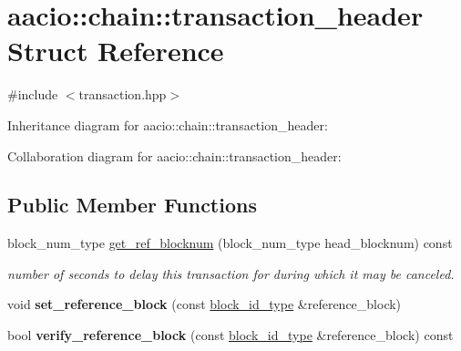 \hypertarget{structaacio_1_1chain_1_1transaction__header}{}\section{aacio\+:\+:chain\+:\+:transaction\+\_\+header Struct Reference}
\label{structaacio_1_1chain_1_1transaction__header}


{\ttfamily \#include $<$transaction.\+hpp$>$}



Inheritance diagram for aacio\+:\+:chain\+:\+:transaction\+\_\+header\+:


Collaboration diagram for aacio\+:\+:chain\+:\+:transaction\+\_\+header\+:
\subsection*{Public Member Functions}
\begin{DoxyCompactItemize}
\item 
block\+\_\+num\+\_\+type \mbox{\hyperlink{structaacio_1_1chain_1_1transaction__header_a75c22201048da255df9412817957df5f}{get\+\_\+ref\+\_\+blocknum}} (block\+\_\+num\+\_\+type head\+\_\+blocknum) const
\begin{DoxyCompactList}\small\item\em number of seconds to delay this transaction for during which it may be canceled. \end{DoxyCompactList}\item 
\mbox{\label{structaacio_1_1chain_1_1transaction__header_a7c6bf187eb3d1a209aff17c59d49ff61}} 
void {\bfseries set\+\_\+reference\+\_\+block} (const \mbox{\hyperlink{classfc_1_1sha256}{block\+\_\+id\+\_\+type}} \&reference\+\_\+block)
\item 
\mbox{\label{structaacio_1_1chain_1_1transaction__header_a61b54f320d0e3fe105f671c769e42f3b}} 
bool {\bfseries verify\+\_\+reference\+\_\+block} (const \mbox{\hyperlink{classfc_1_1sha256}{block\+\_\+id\+\_\+type}} \&reference\+\_\+block) const
\end{DoxyCompactItemize}
